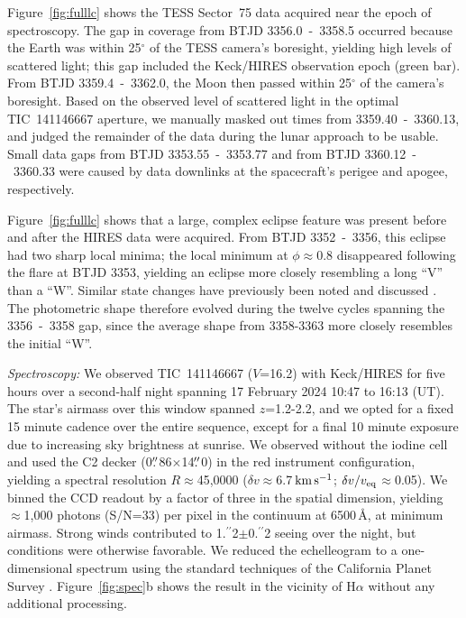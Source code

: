 \documentclass{nature3}
\newcommand{\farcs}{\mbox{\ensuremath{.\!\!^{\prime\prime}}}}%
\newcommand{\kms}{\ensuremath{\rm km\,s^{-1}}}
\begin{document}
\begin{methods}
Figure~\ref{fig:fulllc} shows the TESS Sector~75 data acquired near
the epoch of spectroscopy.  The gap in coverage from BTJD
3356.0~-~3358.5 occurred because the Earth was within 25$^\circ$ of
the TESS camera's boresight, yielding high levels of scattered light;
this gap included the Keck/HIRES observation epoch (green bar).  From
BTJD 3359.4~-~3362.0, the Moon then passed within 25$^\circ$ of the
camera's boresight.  Based on the observed level of scattered light in
the optimal TIC~141146667 aperture, we manually masked out times from
3359.40~-~3360.13, and judged the remainder of the data during the
lunar approach to be usable.  Small data gaps from BTJD
3353.55~-~3353.77 and from BTJD 3360.12~-~3360.33 were caused by data
downlinks at the spacecraft's perigee and apogee, respectively.

Figure~\ref{fig:fulllc} shows that a large, complex eclipse
feature was present before and after the HIRES data were
acquired.  From BTJD 3352~-~3356, this eclipse had two sharp local
minima;  the local minimum at $\phi$$\approx$0.8 disappeared following
the flare at BTJD 3353, yielding an eclipse more closely resembling a
long ``V'' than a ``W''.  Similar state changes have previously been
noted and discussed \cite{Stauffer2017,Bouma2024}.  The photometric
shape therefore evolved during the twelve cycles spanning the
3356~-~3358 gap, since the average shape from 3358-3363 more
closely resembles the initial ``W''.



{\it Spectroscopy:}
We observed TIC~141146667 ($V$=16.2) with Keck/HIRES for five hours over
a second-half night spanning 17 February 2024 10:47 to 16:13 (UT).
The star's airmass over this window spanned $z$=1.2-2.2, and we opted
for a fixed 15 minute cadence over the entire sequence, except for a
final 10 minute exposure due to increasing sky brightness at sunrise.
We observed without the iodine cell and used the C2 decker
(0$\farcs$86$\times$14$\farcs$0) in the red instrument configuration,
yielding a spectral resolution $R$$\approx$45{,}0000 ($\delta
v$$\approx$6.7\,\kms; $\delta v / v_{\rm eq}$$\approx$0.05).  We binned
the CCD readout by a factor of three in the spatial dimension, yielding
$\approx$1,000 photons (S/N=33) per pixel in the continuum at 6500\,\AA,
at minimum airmass.  Strong winds contributed to 1\farcs2$\pm$0\farcs2
seeing over the night, but conditions were otherwise favorable.  We
reduced the echelleogram to a one-dimensional spectrum using the
standard techniques of the California Planet Survey \cite{Howard2010}.
Figure~\ref{fig:spec}b shows the result in the vicinity of H$\alpha$
without any additional processing.



\end{methods}
\end{document}
